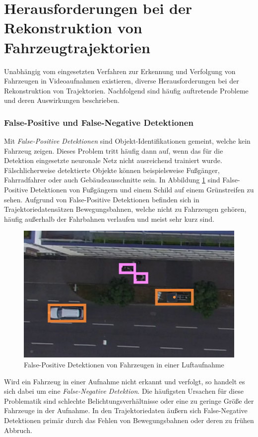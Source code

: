 \section{Herausforderungen bei der Rekonstruktion von Fahrzeugtrajektorien}
\label{sec:grund_challenges_reconstruction}

Unabhängig vom eingesetzten Verfahren zur Erkennung und Verfolgung von Fahrzeugen in Videoaufnahmen
existieren, diverse Herausforderungen bei der Rekonstruktion von Trajektorien. Nachfolgend sind
häufig auftretende Probleme und deren Auswirkungen beschrieben. 

\subsubsection*{False-Positive und False-Negative Detektionen}
Mit \textit{False-Positive Detektionen} sind Objekt-Identifikationen gemeint, welche kein Fahrzeug zeigen.
Dieses Problem tritt häufig dann auf, wenn das für die Detektion eingesetzte neuronale Netz nicht ausreichend trainiert wurde.
Fälschlicherweise detektierte Objekte können beispielsweise Fußgänger, Fahrradfahrer oder auch Gebäudeausschnitte sein.
In Abbildung \ref{fig:grund_false_positive_detections} sind False-Positive Detektionen von Fußgängern
und einem Schild auf einem Grünstreifen zu sehen.
Aufgrund von False-Positive Detektionen befinden sich in Trajektoriedatensätzen Bewegungsbahnen, welche nicht zu
Fahrzeugen gehören, häufig außerhalb der Fahrbahnen verlaufen und meist sehr kurz sind.

\begin{figure}[H]
    \centering
    \includegraphics[width=0.45\linewidth]{resources/img/grundlagen/TrajectoryReconstruction/challenges/False-Positives}
    \caption[False-Positive Detektionen]{False-Positive Detektionen von Fahrzeugen in einer Luftaufnahme}
    \label{fig:grund_false_positive_detections}
\end{figure}

Wird ein Fahrzeug in einer Aufnahme nicht erkannt und verfolgt, so handelt es sich dabei um eine
\textit{False-Negative Detektion}.
Die häufigsten Ursachen für diese Problematik sind schlechte Belichtungsverhältnisse oder eine zu geringe
Größe der Fahrzeuge in der Aufnahme.
In den Trajektoriedaten äußern sich False-Negative Detektionen primär durch das Fehlen von Bewegungsbahnen
oder deren zu frühen Abbruch.

